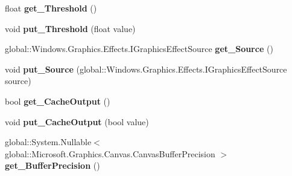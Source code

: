 \begin{DoxyCompactItemize}
\item 
\mbox{\label{class_microsoft_1_1_graphics_1_1_canvas_1_1_effects_1_1_sharpen_effect_a0320c466d500b7944352011eb677edc0}} 
float {\bfseries get\+\_\+\+Threshold} ()
\item 
\mbox{\label{class_microsoft_1_1_graphics_1_1_canvas_1_1_effects_1_1_sharpen_effect_a5f9d61f44f74075ed5a77d67e501fc4f}} 
void {\bfseries put\+\_\+\+Threshold} (float value)
\item 
\mbox{\label{class_microsoft_1_1_graphics_1_1_canvas_1_1_effects_1_1_sharpen_effect_a7bcfebcb9e3ceafcbf99dfeb3b9de323}} 
global\+::\+Windows.\+Graphics.\+Effects.\+I\+Graphics\+Effect\+Source {\bfseries get\+\_\+\+Source} ()
\item 
\mbox{\label{class_microsoft_1_1_graphics_1_1_canvas_1_1_effects_1_1_sharpen_effect_a12f91abb56e7ae6922c9313a4e00dfde}} 
void {\bfseries put\+\_\+\+Source} (global\+::\+Windows.\+Graphics.\+Effects.\+I\+Graphics\+Effect\+Source source)
\item 
\mbox{\label{class_microsoft_1_1_graphics_1_1_canvas_1_1_effects_1_1_sharpen_effect_a878fb9d2596f27d321f103b2d44aa79e}} 
bool {\bfseries get\+\_\+\+Cache\+Output} ()
\item 
\mbox{\label{class_microsoft_1_1_graphics_1_1_canvas_1_1_effects_1_1_sharpen_effect_ab7342a99c9d809586b3739414a9720b2}} 
void {\bfseries put\+\_\+\+Cache\+Output} (bool value)
\item 
\mbox{\label{class_microsoft_1_1_graphics_1_1_canvas_1_1_effects_1_1_sharpen_effect_a539a344bf7716b7ed100f902ce396a2f}} 
global\+::\+System.\+Nullable$<$ global\+::\+Microsoft.\+Graphics.\+Canvas.\+Canvas\+Buffer\+Precision $>$ {\bfseries get\+\_\+\+Buffer\+Precision} ()
\item 

\end{DoxyCompactItemize}
